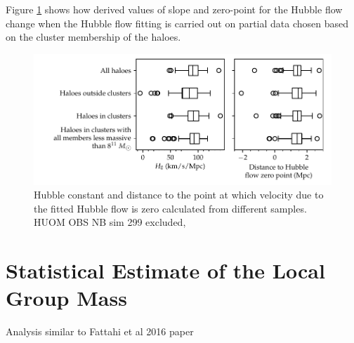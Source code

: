 \documentclass[english, oneside]{HYgradu}
\begin{document}
Figure \ref{fig:clusteredHFparameters} shows how derived values of slope and zero-point for the Hubble flow change when the Hubble flow fitting is carried out on partial data chosen based on the cluster membership of the haloes.

\begin{figure}
    \centering
    \includegraphics{kuvat/clusteredHFparameters.pdf}
    \caption{Hubble constant and distance to the point at which velocity due to the fitted Hubble flow is zero calculated from different samples. HUOM OBS NB sim 299 excluded, }\label{fig:clusteredHFparameters}
\end{figure}



\section{Statistical Estimate of the Local Group Mass}
Analysis similar to Fattahi et al 2016 paper



%
%
\end{document}
